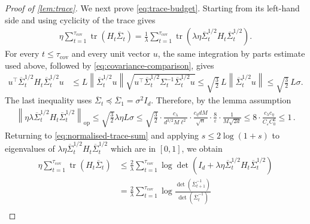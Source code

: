 \documentclass[11pt]{article}
\newcommand{\tr}{\operatorname{tr}}
\newcommand{\op}{\mathrm{op}}
\newcommand{\1}{\mathbf 1}
\newcommand{\eps}{\varepsilon}
\newcommand{\norm}[1]{\left\lVert #1\right\rVert}
\begin{document}
\begin{proof}[Proof of \cref{lem:trace}]
    We next prove \eqref{eq:trace-budget}.  Starting from its left-hand side
    and using cyclicity of the trace gives
    \begin{align}
        \eta\sum_{t=1}^{\tau_{\mathrm{cov}}}
        \tr(H_t\overline\Sigma_t)
        =
        \frac1\lambda\sum_{t=1}^{\tau_{\mathrm{cov}}}
        \tr\left(
        \lambda\eta\overline\Sigma_t^{1/2}H_t
        \overline\Sigma_t^{1/2}
        \right).
        \label{eq:normalised-trace-sum}
    \end{align}
    For every $t\leq\tau_{\mathrm{cov}}$ and every unit vector $u$, the same integration by
    parts estimate used above, followed by
    \eqref{eq:covariance-comparison}, gives
    \begin{align}
        u^\top\overline\Sigma_t^{1/2}H_t
        \overline\Sigma_t^{1/2}u
         & \leq
        L\norm{\overline\Sigma_t^{1/2}u}
        \sqrt{u^\top\overline\Sigma_t^{1/2}
            \Sigma_t^{-1}\overline\Sigma_t^{1/2}u}
        \leq
        \sqrt{\frac32}\,L
        \norm{\overline\Sigma_t^{1/2}u}
        \leq
        \sqrt{\frac32}\,L\sigma.
        \label{eq:normalised-H}
    \end{align}
    The last inequality uses
    $\overline\Sigma_t\preceq\overline\Sigma_1=\sigma^2I_d$.
    Therefore, by the lemma assumption
    \begin{align}
        \norm{\eta\lambda\overline\Sigma_t^{1/2}H_t\overline\Sigma_t^{1/2}}_{\op}
        \leq
        \sqrt{\frac32}\lambda\eta L\sigma
        \leq
        \sqrt{\frac32}\cdot\frac{c_\lambda}{d^{3/2}M\ell^2}\cdot\frac{c_\eta dM}{\sqrt n}\cdot\frac{8}{\eps}
        \cdot\frac1{M\sqrt{2d}}
        \leq
        8\cdot \frac{c_\lambda c_\eta}{C_\eps C_0^6}
        \leq
        1\,.
    \end{align}
    Returning to
    \eqref{eq:normalised-trace-sum} and applying
    $s\leq2\log(1+s)$ to eigenvalues of $\lambda\eta\overline\Sigma_t^{1/2}H_t\overline\Sigma_t^{1/2}$
    which are in $[0,1]$, we obtain
    \begin{align}
        \eta\sum_{t=1}^{\tau_{\mathrm{cov}}}
        \tr(H_t\overline\Sigma_t)
         & \leq
        \frac2\lambda\sum_{t=1}^{\tau_{\mathrm{cov}}}
        \log\det\left(
        I_d+\lambda\eta\overline\Sigma_t^{1/2}H_t
        \overline\Sigma_t^{1/2}
        \right)                        \\
         & =
        \frac2\lambda\sum_{t=1}^{\tau_{\mathrm{cov}}}
        \log\frac{\det(\overline\Sigma_{t+1}^{-1})}
        {\det(\overline\Sigma_t^{-1})} \\

\end{align}
\end{proof}
\end{document}

